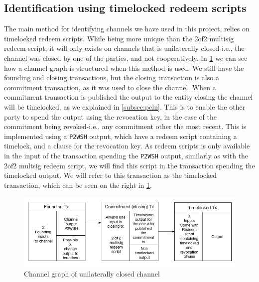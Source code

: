 \subsection{Identification using timelocked redeem scripts}
\label{timelocked_identification}

The main method for identifying channels we have used in this project, relies on timelocked redeem scripts.
While being more unique than the 2of2 multisig redeem script, it will only exists on channels that is unilaterally closed-i.e., the channel was closed by one of the parties, and not cooperatively.
In \cref{fig:ln_tx_graph} we can see how a channel graph is structured when this method is used.
We still have the founding and closing transactions, but the closing transaction is also a commitment transaction, as it was used to close the channel.
When a commitment transaction is published the output to the entity closing the channel will be timelocked, as we explained in \cref{subsec:pcln}.
This is to enable the other party to spend the output using the revocation key, in the case of the commitment being revoked-i.e., any commitment other the most recent.
This is implemented using a {\tt P2WSH} output, which have a redeem script containing a timelock, and a clause for the revocation key.
As redeem scripts is only available in the input of the transaction spending the {\tt P2WSH} output, similarly as with the 2of2 multsig redeem script,
we will find this script in the transaction spending the timelocked output. 
We will refer to this transaction as the timelocked transaction, which can be seen on the right in \cref{fig:ln_tx_graph}.

\begin{figure}[h]
    \centering
    \includegraphics[width=15cm]{figures/chan_graph.png}
    \caption{Channel graph of unilaterally closed channel}
    \label{fig:ln_tx_graph}
\end{figure}

